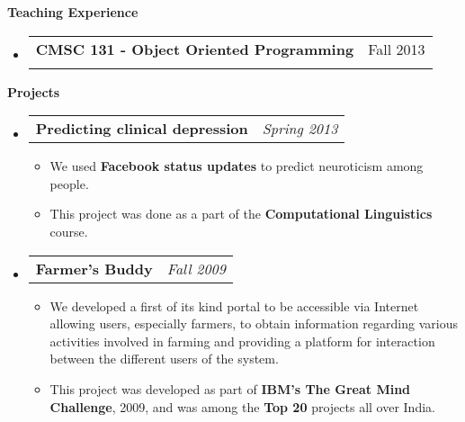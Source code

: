 \documentclass[letterpaper,12pt]{article}
\makeatletter
\newcommand{\resheading}[1]{{\large \colorbox{mygrey}{\begin{minipage}{\textwidth}{\textbf{#1 \vphantom{p\^{E}}}}\end{minipage}}}}
\newcommand{\ressubheading}[4]{
\begin{tabular*}{6in}{l@{\extracolsep{\fill}}r}
		\textbf{#1} & #2 \\
		\textit{#3} & \textit{#4} \\
\end{tabular*}\vspace{-6pt}}
\newcommand{\projectitem}[2]{
\begin{tabular*}{6in}{l@{\extracolsep{\fill}}r}
		\textbf{#1} & \textit{#2} 
\end{tabular*}\vspace{-6pt}}
\makeatother
\begin{document}
\resheading{Teaching Experience}
\begin{itemize}
\item []
 \ressubheading {CMSC 131 - Object Oriented Programming} {Fall 2013} {}{}
 \end{itemize}

\resheading{Projects}
\begin{itemize}
\item
\projectitem{Predicting clinical depression}{Spring 2013}
{\footnotesize
  \begin{itemize}
\item We used \textbf{Facebook status updates} to predict neuroticism among people.
\item This project was done as a part of the \textbf{Computational Linguistics} course.
  \end{itemize}
}
\item
\projectitem{Farmer’s Buddy}{Fall 2009}
{\footnotesize
  \begin{itemize}
  \item We developed a first of its kind portal to be accessible via Internet allowing users, especially farmers, to obtain information regarding various activities involved in farming and providing a platform for interaction between the different users of the system.
  \item This project was developed as part of \textbf{IBM's The Great Mind Challenge}, 2009, and was among the \textbf{Top 20} projects all over India.
  \end{itemize}
}
\end{itemize}
\end{document}
